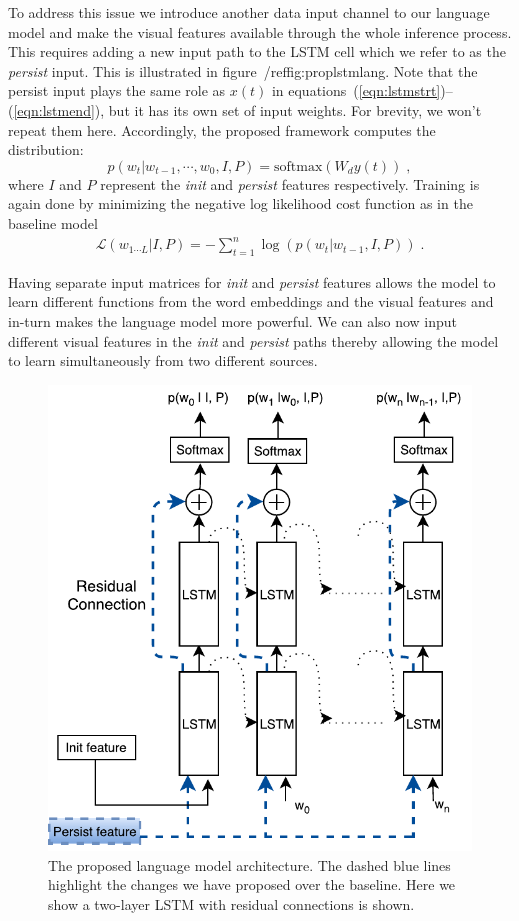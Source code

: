 To address this issue we introduce another data input channel to our
language model and make the visual features available through the whole
inference process.
This requires adding a new input path to the LSTM cell which we refer to as the
\emph{persist} input.
This is illustrated in figure~/ref{fig:proplstmlang}.
Note that the persist input plays the same role as $x(t)$ in
equations~(\ref{eqn:lstmstrt})--(\ref{eqn:lstmend}), but it has its own set of
input weights.
For brevity, we won't repeat them here.
Accordingly, the proposed framework computes the distribution:
\begin{equation}
p(w_t | w_{t-1},\cdots,w_0, I, P) = \text{softmax}(W_d y(t)) \;,
\end{equation}
\noindent where $I$ and $P$ represent the \emph{init} and \emph{persist}
features respectively.
Training is again done by minimizing the negative log likelihood cost function
as in the baseline model
\begin{align}
  \mathcal{L}(w_{1\cdots L} | I,P) = -\sum_{t=1}^n \log(p(w_t|w_{t-1},I,P)) \; .
\end{align}

Having separate input matrices for \emph{init} and \emph{persist} features
allows the model to learn different functions from the word embeddings and the
visual features and in-turn makes the language model more powerful.
We can also now input different visual features in the \emph{init} and
\emph{persist} paths thereby allowing the model to learn simultaneously from two
different sources.

\begin{figure}[t]
\begin{center}
  \includegraphics[width=0.7\linewidth]{images/MultilayerResidualLSTM.pdf}
\end{center}
\vspace*{-4mm}
\caption{The proposed language model architecture. The dashed blue lines
        highlight the changes we have proposed over the baseline. 
        Here we show a two-layer LSTM with residual connections is
        shown.}
\label{fig:proplstmlang}
\end{figure}

